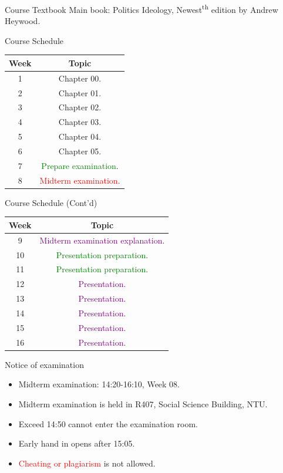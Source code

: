 \documentclass{beamer}
\begin{document}
\begin{frame}{Course Textbook}
Main book: Politics Ideology, Newest\textsuperscript{th} edition by Andrew Heywood. \\
\end{frame}
\begin{frame}{Course Schedule}
\begin{center}
\begin{tabular}{|c|c|}
\hline
Week & Topic \\
\hline
1 & Chapter 00.\\
\hline
2 & Chapter 01.\\
\hline
3 & Chapter 02.\\
\hline
4 & Chapter 03.\\
\hline
5 & Chapter 04.\\
\hline
6 & Chapter 05.\\
\hline
7 & \textcolor{Green}{Prepare examination}.\\
\hline
8 & \textcolor{red}{Midterm examination}.\\
\hline
\end{tabular}
\end{center}
\end{frame}
\begin{frame}{Course Schedule (Cont'd)}
\begin{center}
\begin{tabular}{|c|c|}
\hline
Week & Topic \\
\hline
9 & \textcolor{purple}{Midterm examination explanation}.\\
\hline
10 & \textcolor{Green}{Presentation preparation}.\\
\hline
11 & \textcolor{Green}{Presentation preparation}.\\
\hline
12 & \textcolor{purple}{Presentation}.\\
\hline
13 & \textcolor{purple}{Presentation}.\\
\hline
14 & \textcolor{purple}{Presentation}.\\
\hline
15 & \textcolor{purple}{Presentation}.\\
\hline
16 & \textcolor{purple}{Presentation}.\\
\hline
\end{tabular}
\end{center}
\end{frame}
\begin{frame}{Notice of examination}
\begin{itemize}
\item Midterm examination: 14:20-16:10, Week 08.
\item Midterm examination is held in R407, Social Science Building, NTU.
\item Exceed 14:50 cannot enter the examination room.
\item Early hand in opens after 15:05.
\item \textcolor{red}{Cheating or plagiarism} is not allowed.
\end{itemize}
\end{frame}
\end{document}
